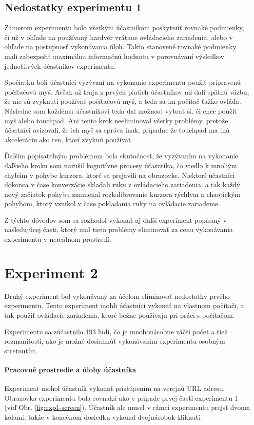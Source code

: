 {\begin{enumerate}
\end{enumerate}
}

\subsection{Nedostatky experimentu 1}
Zámerom experimentu bolo všetkým účastníkom poskytnúť rovnaké podmienky, či už v ohľade na používaný hardvér vrátane ovládacieho zariadenia, alebo v ohľade na postupnosť vykonávania úloh. Takto stanovené rovnaké podmienky mali zabezpečiť maximálnu informačnú hodnotu v porovnávaní výsledkov jednotlivých účastníkov experimentu.

Spočiatku boli účastníci vyzývaní na vykonanie experimentu použiť pripravenú počítačovú myš. Avšak až traja z prvých piatich účastníkov mi dali spätnú väzbu, že nie sú zvyknutí používať počítačovú myš, a teda sa im počítač ťažko ovláda. Následne som každému účastníkovi teda dal možnosť vybrať si, či chce použiť myš alebo touchpad. Ani tento krok neeliminoval všetky problémy, pretože účastníci avizovali, že ich myš sa správa inak, prípadne že touchpad ma inú akceleráciu ako ten, ktorí zvyknú používať.

Ďaľším popísateľným problémom bola skutočnosť, že vyzývaním na vykonanie ďaľšieho kroku som narušil kognitívne procesy účasntíka, čo viedlo k mnohým chybám v pohybe kurzora, ktoré sa prejavili na obrazovke. Niektorí učastníci dokonca v čase konverzácie skladali ruku z ovládacieho zariadenia, a tak každý nový začiatok pohybu znamenal rozkalibrovanie kurzora rýchlym a chaotickým pohybom, ktorý vznikol v čase pokladania ruky na ovládacie zariadenie.

Z týchto dôvodov som sa rozhodol vykonať aj ďaľší experiment popísaný v nasledujúcej časti, ktorý mal tieto problémy eliminovať za cenu vykonávania experimentu v nereálnom prostredí.

\section{Experiment 2\label{sec:exp2}}
Druhý experiment bol vykonávaný za účelom eliminovať nedostatky prvého experimentu. Tento experiment mohli účastníci vykonať na vlastnom počítači, a tak použiť ovládacie zariadenia, ktoré bežne používaju pri práci s počítačom.

Experimentu sa zúčastnilo 193 ľudí, čo je mnohonásobne väčší počet a tiež rozmanitosti, ako je možné dosiahnúť vykonávaním experimentu osobným stretnutím.

\paragraph{Pracovné prostredie a úlohy účastníka}
Experiment mohol účastník vykonať pristúpením na verejnú URL adresu. Obrazovka experimentu bola rovnaká ako v prípade prvej časti experimentu 1 (viď Obr. \ref{fig:exp1-screen}). Účastník ale musel v rámci experimentu prejsť dvoma kolami, takže v konečnom dosledku vykonal dvojnásobok kliknutí.

